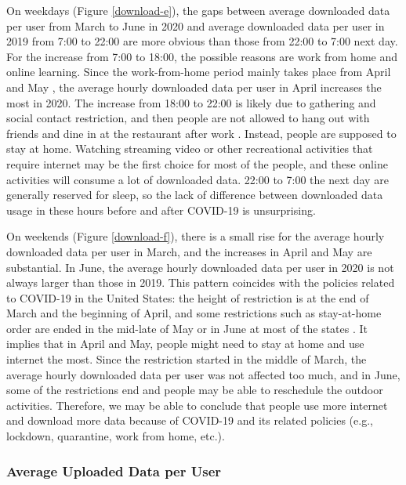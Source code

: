On weekdays (Figure \ref{download-e}), the gaps between average downloaded data per user from March to June in 2020 and average downloaded data per user in 2019 from 7:00 to 22:00 are more obvious than those from 22:00 to 7:00 next day. For the increase from 7:00 to 18:00, the possible reasons are work from home and online learning. Since the work-from-home period mainly takes place from April and May \cite{remotework}, the average hourly downloaded data per user in April increases the most in 2020. The increase from 18:00 to 22:00 is likely due to gathering and social contact restriction, and then people are not allowed to hang out with friends and dine in at the restaurant after work \cite{lockdownsguide}. Instead, people are supposed to stay at home. Watching streaming video or other recreational activities that require internet may be the first choice for most of the people, and these online activities will consume a lot of downloaded data. 22:00 to 7:00 the next day are generally reserved for sleep, so the lack of difference between downloaded data usage in these hours before and after COVID-19 is unsurprising. 

On weekends (Figure \ref{download-f}), there is a small rise for the average hourly downloaded data per user in March, and the increases in April and May are substantial. In June, the average hourly downloaded data per user in 2020 is not always larger than those in 2019. This pattern coincides with the policies related to COVID-19 in the United States: the height of restriction is at the end of March and the beginning of April, and some restrictions such as stay-at-home order are ended in the mid-late of May or in June at most of the states \cite{covid19restriction}. It 
implies that in April and May, people might need to stay at home and use internet the most. Since the restriction started in the middle of March, the average hourly downloaded data per user was not affected too much, and in June, some of the restrictions end and people may be able to reschedule the outdoor activities. Therefore, we may be able to conclude that people use more internet and download more data because of COVID-19 and its related policies (e.g., lockdown, quarantine, work from home, etc.). 

\subsubsection{Average Uploaded Data per User}
\label{sec:upload-data-per-user-over-hours}


